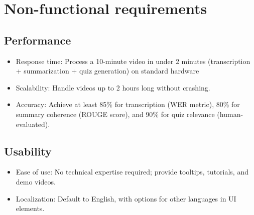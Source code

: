 \section{Non-functional requirements}
\subsection{Performance}
\begin{itemize}
    \item Response time: Process a 10-minute video in under 2 minutes (transcription + summarization + quiz generation) on standard hardware
    \item Scalability: Handle videos up to 2 hours long without crashing.
    \item Accuracy: Achieve at least 85\% for transcription (WER metric), 80\% for summary coherence (ROUGE score), and 90\% for quiz relevance (human-evaluated). 
\end{itemize}

\subsection{Usability}
\begin{itemize}
    \item Ease of use: No technical expertise required; provide tooltips, tutorials, and demo videos. 
    \item Localization: Default to English, with options for other languages in UI elements. 
\end{itemize}